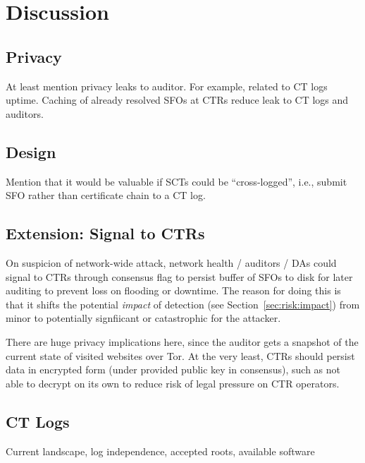 \section{Discussion} \label{sec:discussion}

\subsection{Privacy}
At least mention privacy leaks to auditor. For example, related to CT logs
uptime. Caching of already resolved SFOs at CTRs reduce leak to CT logs and
auditors.

\subsection{Design}
Mention that it would be valuable if SCTs could be ``cross-logged'', i.e.,
submit SFO rather than certificate chain to a CT log.

\subsection{Extension: Signal to CTRs}
On suspicion of network-wide attack, network health / auditors / DAs could
signal to CTRs through consensus flag to persist buffer of SFOs to disk for
later auditing to prevent loss on flooding or downtime. The reason for doing
this is that it shifts the potential \emph{impact} of detection (see
Section~\ref{sec:risk:impact}) from minor to potentially signfiicant or
catastrophic for the attacker.

There are huge privacy implications here, since the auditor gets a snapshot of
the current state of visited websites over Tor. At the very least, CTRs should
persist data in encrypted form (under provided public key in consensus), such as
not able to decrypt on its own to reduce risk of legal pressure on CTR
operators.

\subsection{CT Logs} \label{sec:discussion:logs}
Current landscape, log independence, accepted roots, available software
